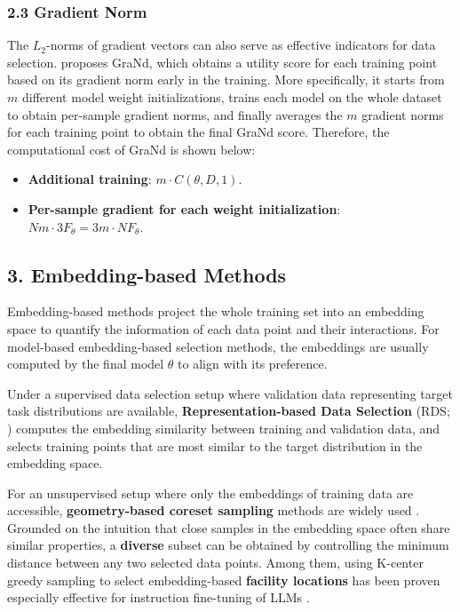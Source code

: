 \subsubsection*{2.3 Gradient Norm}

The $L_2$-norms of gradient vectors can also serve as effective indicators for data selection. \cite{GraNd} proposes GraNd, which obtains a utility score for each training point based on its gradient norm early in the training. More specifically, it starts from $m$ different model weight initializations, trains each model on the whole dataset to obtain per-sample gradient norms, and finally averages the $m$ gradient norms for each training point to obtain the final GraNd score. Therefore, the computational cost of GraNd is shown below:

\begin{itemize}
    \item \textbf{Additional training}: $m \cdot C(\theta, D, 1)$.
    \item \textbf{Per-sample gradient for each weight initialization}: $Nm \cdot 3F_{\theta} = 3m \cdot NF_{\theta}$.
\end{itemize}

\subsection*{3. Embedding-based Methods}

Embedding-based methods project the whole training set into an embedding space to quantify the information of each data point and their interactions. For model-based embedding-based selection methods, the embeddings are usually computed by the final model $\theta$ to align with its preference.

Under a supervised data selection setup where validation data representing target task distributions are available, \textbf{Representation-based Data Selection} (RDS; \cite{RDS1, RDS2}) computes the embedding similarity between training and validation data, and selects training points that are most similar to the target distribution in the embedding space.

For an unsupervised setup where only the embeddings of training data are accessible, \textbf{geometry-based coreset sampling} methods are widely used \cite{Coreset}. Grounded on the intuition that close samples in the embedding space often share similar properties, a \textbf{diverse} subset can be obtained by controlling the minimum distance between any two selected data points. Among them, using K-center greedy sampling to select embedding-based \textbf{facility locations} has been proven especially effective for instruction fine-tuning of LLMs \cite{FacilityLocations}.

